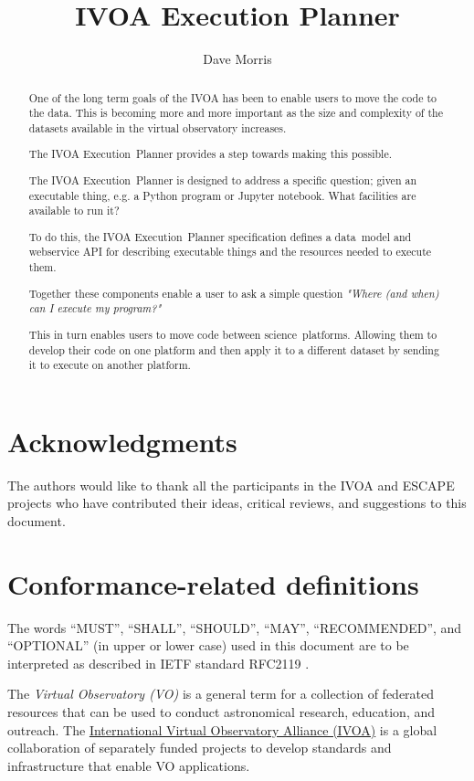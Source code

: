 \documentclass[11pt,a4paper]{ivoa}
\title{IVOA Execution Planner}
\author[http://www.ivoa.net/twiki/bin/view/IVOA/DaveMorris]
       {Dave Morris}
\newcommand{\datamodel} {data~model}
\newcommand{\webservice} {webservice}
\newcommand{\ivoa} {IVOA}
\newcommand{\executionplanner} {Execution~Planner}
\newcommand{\jupyternotebook} {Jupyter notebook}
\newcommand{\pythonprogram} {Python program}
\newcommand{\footurl}[1] {\footnote{\url{#1}}}
\newcommand{\dataset} {dataset}
\newcommand{\scienceplatform} {science~platform}
\begin{document}
\begin{abstract}
\label{abstract}

One of the long term goals of the IVOA has been to enable users to
move the code to the data.
This is becoming more and more important as the size and complexity
of the \dataset{}s available in the virtual observatory increases.

The \ivoa{} \executionplanner{} provides a step towards making this possible.

The \ivoa{} \executionplanner{} is designed to address a specific question;
given an executable thing, e.g. a \pythonprogram{} or \jupyternotebook{}.
What facilities are available to run it?

To do this, the \ivoa{} \executionplanner{} specification defines
a \datamodel{} and \webservice{} API for describing executable things
and the resources needed to execute them.

Together these components enable a user to ask a simple question
\textit{"Where (and when) can I execute my program?"}

This in turn enables users to move code between \scienceplatform{}s.
Allowing them to develop their code on one platform and then apply it to a different
\dataset{} by sending it to execute on another platform.

\end{abstract}

\section*{Acknowledgments}
\label{acknowledgments}

The authors would like to thank all the participants in the IVOA and ESCAPE projects
who have contributed their ideas, critical reviews, and suggestions to this document.

\section*{Conformance-related definitions}

The words ``MUST'', ``SHALL'', ``SHOULD'', ``MAY'', ``RECOMMENDED'', and
``OPTIONAL'' (in upper or lower case) used in this document are to be
interpreted as described in IETF standard RFC2119 \citep{std:RFC2119}.

The \emph{Virtual Observatory (VO)} is a general term for a collection of
federated resources that can be used to conduct astronomical research,
education, and outreach.
The \href{https://www.ivoa.net}{International Virtual Observatory Alliance (IVOA)}
is a global collaboration of separately funded projects to develop standards and
infrastructure that enable VO applications.
\end{document}
